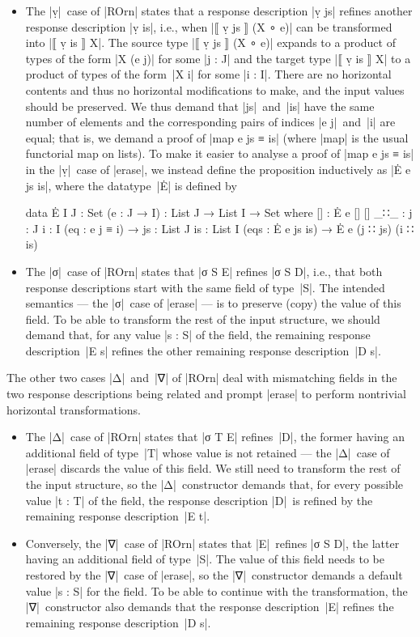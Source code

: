 \begin{itemize}
\item The |ṿ|~case of |ROrn| states that a response description |ṿ js| refines another response description |ṿ is|, i.e., when |⟦ ṿ js ⟧ (X ∘ e)| can be transformed into |⟦ ṿ is ⟧ X|.
The source type |⟦ ṿ js ⟧ (X ∘ e)| expands to a product of types of the form |X (e j)| for some |j : J| and the target type |⟦ ṿ is ⟧ X| to a product of types of the form~|X i| for some |i : I|.
There are no horizontal contents and thus no horizontal modifications to make, and the input values should be preserved.
We thus demand that |js|~and~|is| have the same number of elements and the corresponding pairs of indices |e j|~and~|i| are equal; that is, we demand a proof of |map e js ≡ is| (where |map| is the usual functorial map on lists).
To make it easier to analyse a proof of |map e js ≡ is| in the |ṿ|~case of |erase|, we instead define the proposition inductively as |Ė e js is|, where the datatype~|Ė| is defined by
\begin{code}
data Ė {I J : Set} (e : J → I) : List J → List I → Set where
  []   :  Ė e [] []
  _∷_  :  {j : J} {i : I} (eq : e j ≡ i) →
          {js : List J} {is : List I} (eqs : Ė e js is) → Ė e (j ∷ js) (i ∷ is)
\end{code}
\item The |σ|~case of |ROrn| states that |σ S E| refines |σ S D|, i.e., that both response descriptions start with the same field of type~|S|.
The intended semantics --- the |σ|~case of |erase| --- is to preserve (copy) the value of this field.
To be able to transform the rest of the input structure, we should demand that, for any value |s : S| of the field, the remaining response description~|E s| refines the other remaining response description~|D s|.
\end{itemize}
The other two cases |Δ|~and~|∇| of |ROrn| deal with mismatching fields in the two response descriptions being related and prompt |erase| to perform nontrivial horizontal transformations.
\begin{itemize}
\item The |Δ|~case of |ROrn| states that |σ T E| refines~|D|, the former having an additional field of type~|T| whose value is not retained --- the |Δ|~case of |erase| discards the value of this field.
We still need to transform the rest of the input structure, so the |Δ|~constructor demands that, for every possible value |t : T| of the field, the response description |D|~is refined by the remaining response description~|E t|.
\item Conversely, the |∇|~case of |ROrn| states that |E|~refines |σ S D|, the latter having an additional field of type~|S|.
The value of this field needs to be restored by the |∇|~case of |erase|, so the |∇|~constructor demands a default value |s : S| for the field.
To be able to continue with the transformation, the |∇|~constructor also demands that the response description~|E| refines the remaining response description~|D s|.
\end{itemize}

